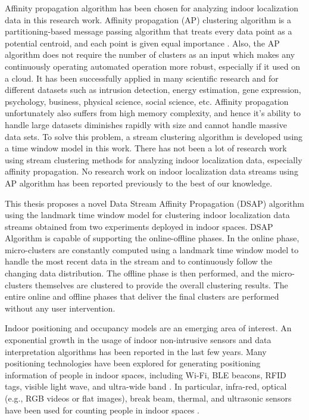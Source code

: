 Affinity propagation algorithm has been chosen for analyzing indoor localization data in this research work. Affinity propagation (AP) clustering algorithm is a partitioning-based message passing algorithm that treats every data point as a potential centroid, and each point is given equal importance \cite{dueck2009affinity}. Also, the AP algorithm does not require the number of clusters as an input which makes any continuously operating automated operation more robust, especially if it used on a cloud. It has been successfully applied in many scientific research and for different datasets such as intrusion detection, energy estimation, gene expression, psychology, business, physical science, social science, etc. 
Affinity propagation unfortunately also suffers from high memory complexity, and hence it's ability to handle large datasets diminishes rapidly with size and cannot handle massive data sets. To solve this problem, a stream clustering algorithm is developed using a time window model in this work. There has not been a lot of research work using stream clustering methods for analyzing indoor localization data, especially affinity propagation. No research work on indoor localization data streams using AP algorithm has been reported previously to the best of our knowledge.

This thesis proposes a novel Data Stream Affinity Propagation (DSAP) algorithm using the landmark time window model for clustering indoor localization data streams obtained from two experiments deployed in indoor spaces. DSAP Algorithm is capable of supporting the online-offline phases. In the online phase, micro-clusters are constantly computed using a landmark time window model to handle the most recent data in the stream and to continuously follow the changing data distribution. The offline phase is then performed, and the micro-clusters themselves are clustered to provide the overall clustering results. The entire online and offline phases that deliver the final clusters are performed without any user intervention.

Indoor positioning and occupancy models are an emerging area of interest. An exponential growth in the usage of indoor non-intrusive sensors and data interpretation algorithms has been reported in the last few years. 
Many positioning technologies have been explored for generating positioning information of people in indoor spaces, including Wi-Fi, BLE beacons, RFID tags, visible light wave, and ultra-wide band \cite{namiot2015indoor, jeon2018ble}. In particular, infra-red, optical (e.g., RGB videos or flat images), break beam, thermal, and ultrasonic sensors have been used for counting people in indoor spaces \cite{mautz2012indoor}. 

